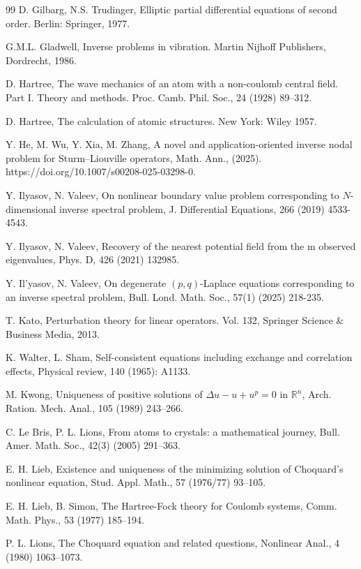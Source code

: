 \documentclass[12pt,thmsa]{article}
\begin{document}
\begin{thebibliography}{99}
 D. Gilbarg, N.S. Trudinger, Elliptic partial differential
equations of second order. Berlin: Springer, 1977.

 G.M.L. Gladwell, Inverse problems in vibration. Martin
Nijhoff Publishers, Dordrecht, 1986.

 D. Hartree, The wave mechanics of an atom with a
non-coulomb central field. Part I. Theory and methods. Proc. Camb. Phil.
Soc., 24 (1928) 89--312.

 D. Hartree, The calculation of atomic structures. New
York: Wiley 1957.

 Y. He, M. Wu, Y. Xia, M. Zhang, A novel and
application-oriented inverse nodal problem for Sturm--Liouville operators,
Math. Ann., (2025). https://doi.org/10.1007/s00208-025-03298-0.

 Y. Ilyasov, N. Valeev, On nonlinear boundary value
problem corresponding to $N$-dimensional inverse spectral problem, J.
Differential Equations, 266 (2019) 4533-4543.

 Y. Ilyasov, N. Valeev, Recovery of the nearest
potential field from the m observed eigenvalues, Phys. D, 426 (2021) 132985.

 Y. Il'yasov, N. Valeev, On degenerate $(p,q)$-Laplace
equations corresponding to an inverse spectral problem, Bull. Lond. Math.
Soc., 57(1) (2025) 218-235.

 T. Kato, Perturbation theory for linear operators. Vol. 132,
Springer Science \& Business Media, 2013.

 K. Walter, L. Sham, Self-consistent equations including
exchange and correlation effects, Physical review, 140 (1965): A1133.

 M. Kwong, Uniqueness of positive solutions of $\Delta
u-u+u^p= 0$ in $\mathbb{R}^n$, Arch. Ration. Mech. Anal., 105 (1989)
243--266.

 C. Le Bris, P. L. Lions, From atoms to crystals: a
mathematical journey, Bull. Amer. Math. Soc., 42(3) (2005) 291--363.

 E. H. Lieb, Existence and uniqueness of the minimizing
solution of Choquard's nonlinear equation, Stud. Appl. Math., 57 (1976/77)
93--105.

 E. H. Lieb, B. Simon, The Hartree-Fock theory for
Coulomb systems, Comm. Math. Phys., 53 (1977) 185--194.

 P. L. Lions, The Choquard equation and related questions,
Nonlinear Anal., 4 (1980) 1063--1073.


\end{thebibliography}
\end{document}
